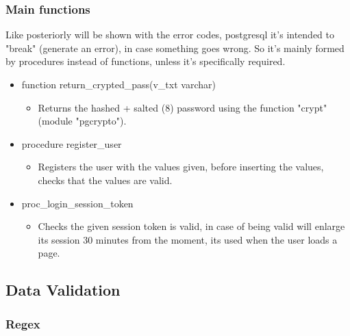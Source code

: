 \newpage
\subsubsection[Main functions]{Main functions}
\begin{flushleft}
    Like posteriorly will be shown with the error codes, postgresql it's intended to "break" (generate an error), in
    case something goes wrong.
    So it's mainly formed by procedures instead of functions, unless it's specifically required.

    \begin{itemize}
        \item  function return\_crypted\_pass(v\_txt varchar)
        \begin{itemize}
            \item Returns the hashed + salted (8) password using the function "crypt" (module "pgcrypto").
        \end{itemize}
        \item  procedure register\_user
        \begin{itemize}
            \item Registers the user with the values given, before inserting the values, checks that the values are valid.
        \end{itemize}
        \item  proc\_login\_session\_token
        \begin{itemize}
            \item Checks the given session token is valid, in case of being valid will enlarge its session 30 minutes from the moment,
            its used when the user loads a page.
        \end{itemize}
    \end{itemize}
\end{flushleft}


\newpage
\subsection{Data Validation}\label{subsec:data-validation}
\subsubsection[Regex]{Regex}

